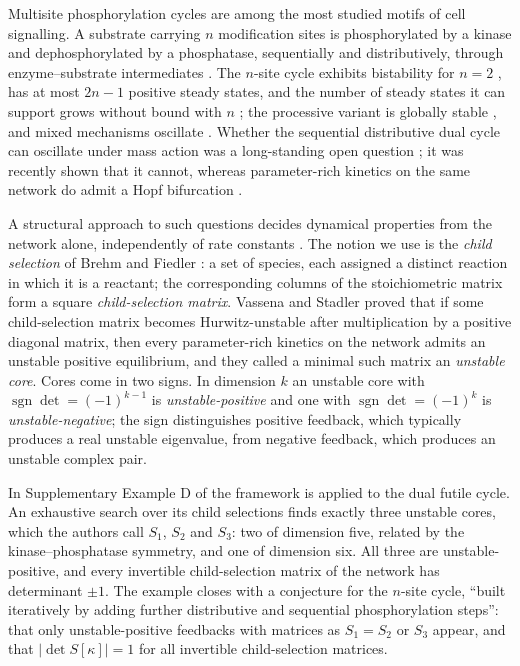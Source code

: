 \documentclass[11pt,a4paper]{article}
\theoremstyle{plain}
\theoremstyle{definition}
\theoremstyle{remark}
\DeclareMathOperator{\sgn}{sgn}
\begin{document}
Multisite phosphorylation cycles are among the most studied motifs of cell signalling. A substrate carrying $n$ modification sites is phosphorylated by a kinase and dephosphorylated by a phosphatase, sequentially and distributively, through enzyme--substrate intermediates \citep{Markevich2004,Gunawardena2005,ConradiShiu2018}. The $n$-site cycle exhibits bistability for $n=2$ \citep{Markevich2004,HellRendall2015}, has at most $2n-1$ positive steady states, and the number of steady states it can support grows without bound with $n$ \citep{WangSontag2008,ThomsonGunawardena2009,FeliuRendallWiuf2020}; the processive variant is globally stable \citep{Rao2017}, and mixed mechanisms oscillate \citep{SuwanmajoKrishnan2015,ConradiMinchevaShiu2019}. Whether the sequential distributive dual cycle can oscillate under mass action was a long-standing open question \citep{Errami2015,ConradiShiu2018}; it was recently shown that it cannot, whereas parameter-rich kinetics on the same network do admit a Hopf bifurcation \citep{Vassena2026}.

A structural approach to such questions decides dynamical properties from the network alone, independently of rate constants \citep{Clarke1980,MinchevaRoussel2007,Feinberg2019}. The notion we use is the \emph{child selection} of Brehm and Fiedler \citep{BrehmFiedler2018,Vassena2020}: a set of species, each assigned a distinct reaction in which it is a reactant; the corresponding columns of the stoichiometric matrix form a square \emph{child-selection matrix}. Vassena and Stadler \citep{VassenaStadler2024} proved that if some child-selection matrix becomes Hurwitz-unstable after multiplication by a positive diagonal matrix, then every parameter-rich kinetics on the network admits an unstable positive equilibrium, and they called a minimal such matrix an \emph{unstable core}. Cores come in two signs. In dimension $k$ an unstable core with $\sgn\det=(-1)^{k-1}$ is \emph{unstable-positive} and one with $\sgn\det=(-1)^k$ is \emph{unstable-negative}; the sign distinguishes positive feedback, which typically produces a real unstable eigenvalue, from negative feedback, which produces an unstable complex pair.

In Supplementary Example D of \citep{VassenaStadler2024} the framework is applied to the dual futile cycle. An exhaustive search over its child selections finds exactly three unstable cores, which the authors call $S_1$, $S_2$ and $S_3$: two of dimension five, related by the kinase--phosphatase symmetry, and one of dimension six. All three are unstable-positive, and every invertible child-selection matrix of the network has determinant $\pm1$. The example closes with a conjecture for the $n$-site cycle, ``built iteratively by adding further distributive and sequential phosphorylation steps'': that only unstable-positive feedbacks with matrices as $S_1=S_2$ or $S_3$ appear, and that $|\det S[\kappa]|=1$ for all invertible child-selection matrices.
\end{document}
